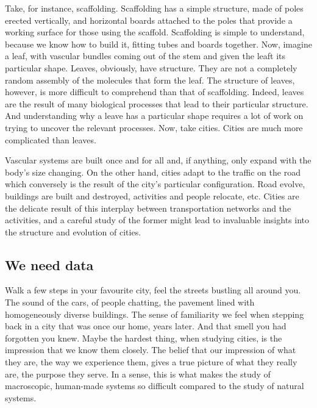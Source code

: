 Take, for instance, scaffolding. Scaffolding has a simple structure, made of
poles erected vertically, and horizontal boards attached to the poles that provide a
working surface for those using the scaffold. Scaffolding is simple to
understand, because we know how to build it, fitting tubes and boards together.
Now, imagine a leaf, with vascular bundles coming out of the stem and given the
leaft its particular shape. Leaves, obviously, have structure. They are not a
completely random assembly of the molecules that form the leaf. The structure of
leaves, however, is more difficult to comprehend than that of scaffolding.
Indeed, leaves are the result of many biological processes that lead to their
particular structure. And understanding why a leave has a particular shape
requires a lot of work on trying to uncover the relevant processes. 
Now, take cities. Cities are much more complicated than leaves.


Vascular systems are built once and for all and, if anything, only expand with
the body's size changing. On the other hand, cities adapt to the traffic on the
road which conversely is the result of the city's particular configuration.
Road evolve, buildings are built and destroyed, activities and people relocate,
etc. Cities are the delicate result of this interplay between transportation
networks and the activities, and a careful study of the former might lead to
invaluable insights into the structure and evolution of cities.


\subsection{We need data}
\label{sub:we_need_data}

Walk a few steps in your favourite city, feel the streets bustling all around
you. The sound of the cars, of people chatting, the pavement lined with
 homogeneously diverse buildings. The sense of familiarity we feel when stepping
back in a city that was once our home, years later. And that smell you had
forgotten you knew. Maybe the hardest thing, when studying cities, is the
impression that we know them closely. The belief that our impression of what
they are, the way we experience them, gives a true picture of what they really
are, the purpose they serve. In a sense, this is what makes the study of
macroscopic, human-made systems so difficult compared to the study of natural
systems. 

